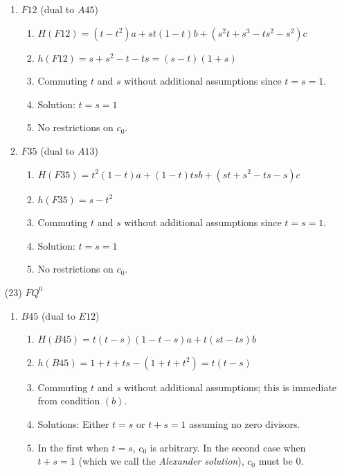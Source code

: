 \documentclass[11pt]{amsart}
\theoremstyle{definition}
\begin{document}
\begin{enumerate}
\begin{enumerate}
            \item $F12$ (dual to $A45$)
            \begin{enumerate}
                \item $H(F12) = (t-t^2)a +st(1-t)b + (s^2t+s^3-ts^2-s^2)c$
                \item  $h(F12) = s +s^2 -t -ts =(s-t)(1+s)$
                \item Commuting $t$ and $s$ without additional assumptions since $t=s=1$.
                \item Solution: $t=s=1$  
                \item No restrictions on $c_0$.
            \end{enumerate}

        \item $F35$ (dual to $A13$)
            \begin{enumerate}
                \item $H(F35) = t^2(1-t)a +(1-t)tsb + (st+s^2 -ts -s) c $
                \item  $h(F35) = s -t^2$
                \item Commuting $t$ and $s$ without additional assumptions since $t=s=1$.
                \item Solution: $t=s=1$  
                \item No restrictions on $c_0$.
            \end{enumerate}
        \end{enumerate}


\item[(23)] $FQ^0$
        \begin{enumerate}
            \item $B45$ (dual to $E12$)
            \begin{enumerate}
                \item $H(B45)= t(t-s)(1-t-s)a + t(st-ts)b$ 
                \item  $h(B45)= 1+t+ts -(1+t+t^2)= t(t-s)$
                \item Commuting $t$ and $s$ without additional assumptions; this is immediate from condition $(b)$.
                \item Solutions: Either $t=s$ or $t+s=1$ assuming no zero divisors.
                \item In the first when $t = s$, $c_0$ is arbitrary. In the second case when $t + s = 1$ (which we call the {\it Alexander solution}), $c_0$ must be $0$.
            \end{enumerate}


\end{enumerate}
\end{enumerate}
\end{document}
